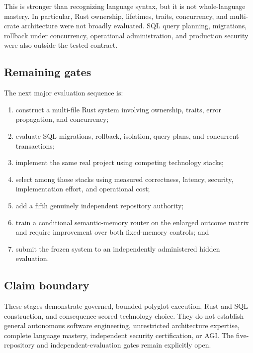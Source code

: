 This is stronger than recognizing language syntax, but it is not whole-language
mastery.  In particular, Rust ownership, lifetimes, traits, concurrency, and
multi-crate architecture were not broadly evaluated.  SQL query planning,
migrations, rollback under concurrency, operational administration, and
production security were also outside the tested contract.

\subsection{Remaining gates}

The next major evaluation sequence is:
\begin{enumerate}
  \item construct a multi-file Rust system involving ownership, traits, error
        propagation, and concurrency;
  \item evaluate SQL migrations, rollback, isolation, query plans, and
        concurrent transactions;
  \item implement the same real project using competing technology stacks;
  \item select among those stacks using measured correctness, latency,
        security, implementation effort, and operational cost;
  \item add a fifth genuinely independent repository authority;
  \item train a conditional semantic-memory router on the enlarged outcome
        matrix and require improvement over both fixed-memory controls; and
  \item submit the frozen system to an independently administered hidden
        evaluation.
\end{enumerate}

\subsection{Claim boundary}

These stages demonstrate governed, bounded polyglot execution, Rust and SQL
construction, and consequence-scored technology choice.  They do not establish
general autonomous software engineering, unrestricted architecture expertise,
complete language mastery, independent security certification, or AGI.  The
five-repository and independent-evaluation gates remain explicitly open.
